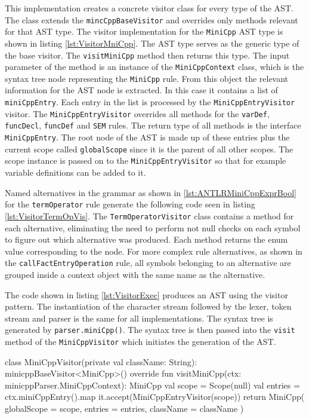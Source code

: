 This implementation creates a concrete visitor class for every type of the AST. The class extends the \verb|mincCppBaseVisitor| and overrides only methods relevant for that AST type. The visitor implementation for the \verb|MiniCpp| AST type is shown in listing \ref{lst:VisitorMniCpp}. The AST type serves as the generic type of the base visitor. The \verb|visitMiniCpp| method then returns this type. The input parameter of the method is an instance of the \verb|MiniCppContext| class, which is the syntax tree node representing the \verb|MiniCpp| rule. From this object the relevant information for the AST node is extracted. In this case it contains a list of \verb|miniCppEntry|. Each entry in the list is processed by the \verb|MiniCppEntryVisitor| visitor. The \verb|MiniCppEntryVisitor| overrides all methods for the \verb|varDef|, \verb|funcDecl|, \verb|funcDef| and \verb|SEM| rules. The return type of all methods is the interface \verb|MiniCppEntry|. The root node of the AST is made up of these entries plus the current scope called \verb|globalScope| since it is the parent of all other scopes. The scope instance is passed on to the \verb|MiniCppEntryVisitor| so that for example variable definitions can be added to it.

Named alternatives in the grammar as shown in \ref{lst:ANTLRMiniCppExprBool} for the \verb|termOperator| rule generate the following code seen in listing \ref{lst:VisitorTermOpVis}. The \verb|TermOperatorVisitor| class contains a method for each alternative, eliminating the need to perform not null checks on each symbol to figure out which alternative was produced. Each method returns the enum value corresponding to the node. For more complex rule alternatives, as shown in the \verb|callFactEntryOperation| rule, all symbols belonging to an alternative are grouped inside a context object with the same name as the alternative.

The code shown in listing \ref{lst:VisitorExec} produces an AST using the visitor pattern. The instantiation of the character stream followed by the lexer, token stream and parser is the same for all implementations. The syntax tree is generated by \verb|parser.miniCpp()|. The syntax tree is then passed into the \verb|visit| method of the \verb|MiniCppVisitor| which initiates the generation of the AST.




\begin{KotlinCode}[float,numbers=none,caption=Implementation of the \texttt{MiniCppVisitor} class., label=lst:VisitorMniCpp]
class MiniCppVisitor(private val className: String): minicppBaseVisitor<MiniCpp>() {
    override fun visitMiniCpp(ctx: minicppParser.MiniCppContext): MiniCpp {
       val scope = Scope(null)
       val entries = ctx.miniCppEntry().map { it.accept(MiniCppEntryVisitor(scope)) }
       return MiniCpp(
           globalScope = scope,
           entries = entries,
           className = className
       )
    }
}
\end{KotlinCode}


